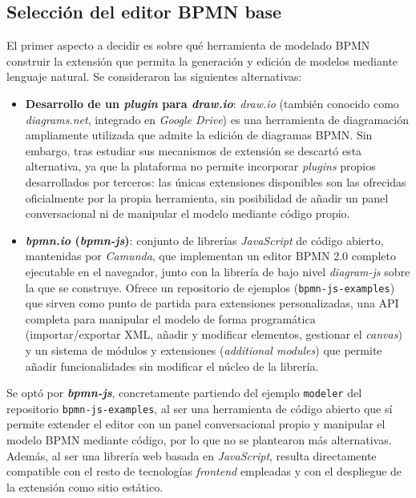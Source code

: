 {%
\subsection{Selección del editor BPMN base}
\label{subsec:seleccionEditor}

El primer aspecto a decidir es sobre qué herramienta de modelado BPMN construir la extensión que permita la generación y edición de modelos mediante lenguaje natural. Se consideraron las siguientes alternativas:

\begin{itemize}
    \item \textbf{Desarrollo de un \textit{plugin} para \textit{draw.io}}: \textit{draw.io} (también conocido como \textit{diagrams.net}, integrado en \textit{Google Drive}) es una herramienta de diagramación ampliamente utilizada que admite la edición de diagramas BPMN. Sin embargo, tras estudiar sus mecanismos de extensión se descartó esta alternativa, ya que la plataforma no permite incorporar \textit{plugins} propios desarrollados por terceros: las únicas extensiones disponibles son las ofrecidas oficialmente por la propia herramienta, sin posibilidad de añadir un panel conversacional ni de manipular el modelo mediante código propio.
    \item \textbf{\textit{bpmn.io} (\textit{bpmn-js})}: conjunto de librerías \textit{JavaScript} de código abierto, mantenidas por \textit{Camunda}, que implementan un editor BPMN 2.0 completo ejecutable en el navegador, junto con la librería de bajo nivel \textit{diagram-js} sobre la que se construye. Ofrece un repositorio de ejemplos (\texttt{bpmn-js-examples}) que sirven como punto de partida para extensiones personalizadas, una API completa para manipular el modelo de forma programática (importar/exportar XML, añadir y modificar elementos, gestionar el \textit{canvas}) y un sistema de módulos y extensiones (\textit{additional modules}) que permite añadir funcionalidades sin modificar el núcleo de la librería.
\end{itemize}

Se optó por \textbf{\textit{bpmn-js}}, concretamente partiendo del ejemplo \texttt{modeler} del repositorio \texttt{bpmn-js-examples}, al ser una herramienta de código abierto que sí permite extender el editor con un panel conversacional propio y manipular el modelo BPMN mediante código, por lo que no se plantearon más alternativas. Además, al ser una librería web basada en \textit{JavaScript}, resulta directamente compatible con el resto de tecnologías \textit{frontend} empleadas y con el despliegue de la extensión como sitio estático.

}
